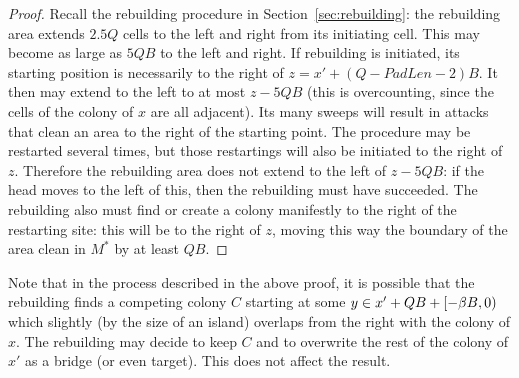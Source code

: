 \documentclass[11pt]{memoir}
\theoremstyle{definition} %
\def\B{B}
\newcommand{\Q}{Q}
\newcommand{\PadLen}{\mathit{PadLen}}
\newcommand{\cns}[1]{c_{\textrm{\upshape #1}}}
\newcommand{\CSpill}{\cns{spill}}
\begin{document}
\begin{proof}
Recall the rebuilding procedure in Section~\ref{sec:rebuilding}:
the rebuilding area extends \( 2.5\Q \) cells to the left and right from its initiating cell.
This may become as large as \( 5\Q\B \) to the left and right.
If rebuilding is initiated, its starting position
is necessarily to the right of \( z=x'+(\Q-\PadLen-2)\B \).
It then may extend to the left to at most \( z-5\Q\B \) (this is overcounting,
since the cells of the colony of \( x \) are all adjacent).
Its many sweeps will result in attacks that clean an area to the right of the starting point.
The procedure may be restarted several times, but those restartings will also be initiated
to the right of \( z \).
Therefore the rebuilding area does not extend to the left of \( z-5\Q\B \):
if the head moves to the left of this, then the rebuilding must have succeeded.
The rebuilding also must find or create a colony manifestly to the right of the restarting site: this will be
to the right of \( z \), moving this way the boundary of the area clean in \( M^{*} \) 
by at least \( \Q\B \).
\end{proof}

Note that in the process described in the above proof,
it is possible that the rebuilding finds a competing colony \( C \)
starting at some \( y \in x'+\Q\B + \lint{-\beta\B}{0}\) which
slightly (by the size of an island) overlaps from the right with the colony of \( x \).
The rebuilding may decide to keep \( C \) and to overwrite the rest of the colony of \( x' \) as a bridge
(or even target).
This does not affect the result.


\end{document}
